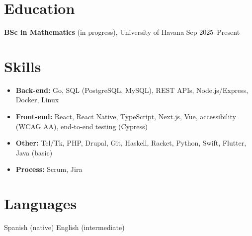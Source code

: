 \documentclass[10pt,a4paper]{article}
\begin{document}
\section*{Education}
\textbf{BSc in Mathematics} (in progress), University of Havana \hfill {\small\color{muted}Sep 2025--Present}\par

\section*{Skills}
\begin{itemize}
  \item[] \textbf{Back-end:} Go, SQL (PostgreSQL, MySQL), REST APIs, Node.js/Express, Docker, Linux
  \item[] \textbf{Front-end:} React, React Native, TypeScript, Next.js, Vue, accessibility (WCAG AA), end-to-end testing (Cypress)
  \item[] \textbf{Other:} Tcl/Tk, PHP, Drupal, Git, Haskell, Racket, Python, Swift, Flutter, Java (basic)
  \item[] \textbf{Process:} Scrum, Jira
\end{itemize}

\section*{Languages}
Spanish (native) \textbullet{} English (intermediate)
\end{document}
